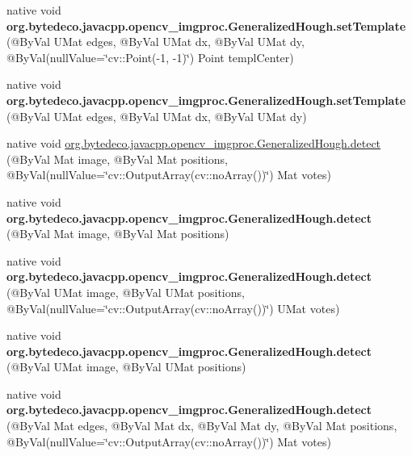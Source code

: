\begin{DoxyCompactItemize}
\item 
\mbox{\label{group__imgproc_ga5b84de74e671dabd19b56647c70fa6a8}} 
native void {\bfseries org.\+bytedeco.\+javacpp.\+opencv\+\_\+imgproc.\+Generalized\+Hough.\+set\+Template} (@By\+Val U\+Mat edges, @By\+Val U\+Mat dx, @By\+Val U\+Mat dy, @By\+Val(null\+Value=\char`\"{}cv\+::\+Point(-\/1, -\/1)\char`\"{}) Point templ\+Center)
\item 
\mbox{\label{group__imgproc_ga376f795b638014b6913df217287adedf}} 
native void {\bfseries org.\+bytedeco.\+javacpp.\+opencv\+\_\+imgproc.\+Generalized\+Hough.\+set\+Template} (@By\+Val U\+Mat edges, @By\+Val U\+Mat dx, @By\+Val U\+Mat dy)
\item 
native void \hyperlink{group__imgproc_ga85f8c877156761def90adf12f47cf2d7}{org.\+bytedeco.\+javacpp.\+opencv\+\_\+imgproc.\+Generalized\+Hough.\+detect} (@By\+Val Mat image, @By\+Val Mat positions, @By\+Val(null\+Value=\char`\"{}cv\+::\+Output\+Array(cv\+::no\+Array())\char`\"{}) Mat votes)
\item 
\mbox{\label{group__imgproc_gafa4cdb7109c63ea103f235711d281164}} 
native void {\bfseries org.\+bytedeco.\+javacpp.\+opencv\+\_\+imgproc.\+Generalized\+Hough.\+detect} (@By\+Val Mat image, @By\+Val Mat positions)
\item 
\mbox{\label{group__imgproc_gae6dbf10c5f3e8671c5d40d0565674c5d}} 
native void {\bfseries org.\+bytedeco.\+javacpp.\+opencv\+\_\+imgproc.\+Generalized\+Hough.\+detect} (@By\+Val U\+Mat image, @By\+Val U\+Mat positions, @By\+Val(null\+Value=\char`\"{}cv\+::\+Output\+Array(cv\+::no\+Array())\char`\"{}) U\+Mat votes)
\item 
\mbox{\label{group__imgproc_ga636e88b9b2ecb856ddc0b34682da18cb}} 
native void {\bfseries org.\+bytedeco.\+javacpp.\+opencv\+\_\+imgproc.\+Generalized\+Hough.\+detect} (@By\+Val U\+Mat image, @By\+Val U\+Mat positions)
\item 
\mbox{\label{group__imgproc_gae9f1d2c4478fd9457de123d9e48f52b8}} 
native void {\bfseries org.\+bytedeco.\+javacpp.\+opencv\+\_\+imgproc.\+Generalized\+Hough.\+detect} (@By\+Val Mat edges, @By\+Val Mat dx, @By\+Val Mat dy, @By\+Val Mat positions, @By\+Val(null\+Value=\char`\"{}cv\+::\+Output\+Array(cv\+::no\+Array())\char`\"{}) Mat votes)

\end{DoxyCompactItemize}
